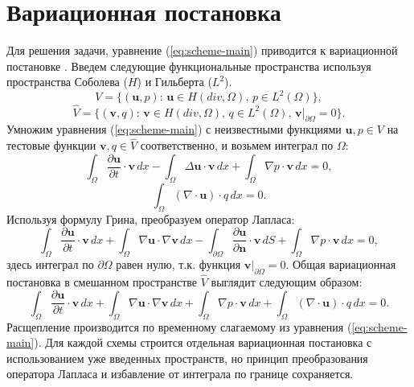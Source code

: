\documentclass[12pt]{article}
\begin{document}

\section{Вариационная постановка}
Для решения задачи, уравнение (\ref{eq:scheme-main}) приводится к вариационной постановке \cite{fenicsbook-2012}. Введем следующие функциональные пространства используя пространства Соболева ($H$) и Гильберта ($L^2$).
$$
V=\{ ({\bm u}, p) : \, {\bm u} \in H(div, \Omega), \, p \in L^2(\Omega) \},
$$
$$
\hat V=\{ ({\bm v}, q) : \, {\bm v} \in H(div, \Omega), \, q \in L^2(\Omega), \, {\bm v}|_{\partial \Omega}=0 \}.
$$
Умножим уравнения (\ref{eq:scheme-main}) с неизвестными функциями ${\bm u}, p \in V$  на тестовые функции ${\bm v}, q \in \hat V$ соответственно, и возьмем интеграл по $\Omega$:
$$
\int_{\Omega} \frac{\partial {\bm u}}{\partial t} \cdot {\bm v} \,dx - \int_{\Omega} \Delta {\bm u} \cdot {\bm v} \,dx + \int_{\Omega} \nabla p \cdot {\bm v} \,dx = 0,
$$
$$
\int_{\Omega} (\nabla \cdot {\bm u}) \cdot q \,dx = 0.
$$
Используя формулу Грина, преобразуем оператор Лапласа:
$$
\int_{\Omega} \frac{\partial {\bm u}}{\partial t} \cdot {\bm v} \,dx + \int_{\Omega} \nabla {\bm u} \cdot \nabla {\bm v} \,dx - \int_{\partial \Omega} \frac{\partial {\bm u}}{\partial {\bm n}} \cdot {\bm v} \,dS + \int_{\Omega} \nabla p \cdot {\bm v} \,dx = 0,
$$
здесь интеграл по $\partial \Omega$ равен нулю, т.к. функция ${\bm v} | _ {\partial \Omega} = 0$. Общая вариационная постановка в смешанном пространстве $\hat V$ выглядит следующим образом:
$$
\int_{\Omega} \frac{\partial {\bm u}}{\partial t} \cdot {\bm v} \,dx + \int_{\Omega} \nabla {\bm u} \cdot \nabla {\bm v} \,dx + \int_{\Omega} \nabla p \cdot {\bm v} \,dx + \int_{\Omega} (\nabla \cdot {\bm u}) \cdot q \,dx = 0.
$$
Расщепление производится по временному слагаемому из уравнения (\ref{eq:scheme-main}). Для каждой схемы строится отдельная вариационная постановка с использованием уже введенных пространств, но принцип преобразования оператора Лапласа и избавление от интеграла по границе сохраняется.
\end{document}
